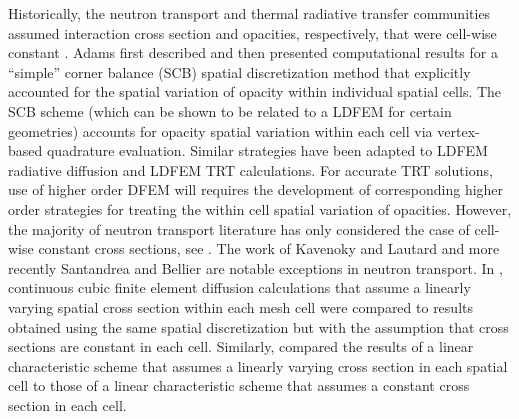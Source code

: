 Historically, the neutron transport and thermal radiative transfer communities assumed interaction cross section and opacities, respectively, that were cell-wise constant \cite{adams,lewis_book,morel_radtran}.
Adams first described \cite{adams_scb} and then presented computational results \cite{adams_nowak} for a ``simple'' corner balance (SCB) spatial discretization method that explicitly accounted for the spatial variation of opacity within individual spatial cells.
The SCB scheme (which can be shown to be related to a LDFEM for certain geometries) accounts for opacity spatial variation within each cell via vertex-based quadrature evaluation.  
Similar strategies have been adapted to LDFEM radiative diffusion \cite{ober_shadid} and LDFEM TRT \cite{warsa_lmfga} calculations.
For accurate TRT solutions, use of higher order DFEM will requires the development of corresponding higher order strategies  for treating the within cell spatial variation of opacities.  
However, the majority of neutron transport literature has only considered the case of cell-wise constant cross sections, see \cite{adams, lewis_book, warsa_krylov, yaqi_ragusa2}. 
The work of Kavenoky and Lautard \cite{varXS_diff} and more recently Santandrea and Bellier \cite{varXS_MOC} are notable exceptions in neutron transport. 
In \cite{varXS_diff}, continuous cubic finite element diffusion calculations that assume a linearly varying spatial cross section within each mesh cell were compared to results obtained using the same spatial discretization but with the assumption that cross sections are constant in each cell.
Similarly, \cite{varXS_MOC} compared the results of a linear characteristic scheme that assumes a linearly varying cross section in each spatial cell 
to those of a linear characteristic scheme that assumes a constant cross section in each cell.

